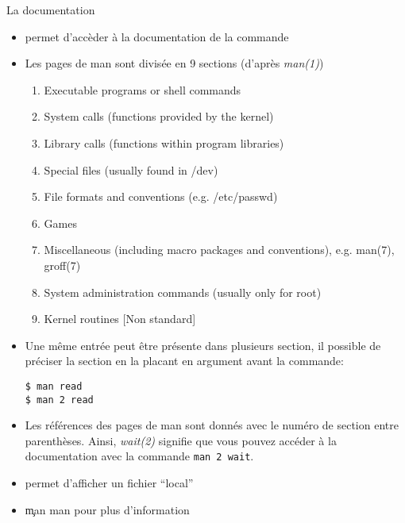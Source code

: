 \begin{frame}[fragile=singleslide]{La documentation}
  \begin{itemize}
  \item   {} permet d'accèder à la documentation de la commande
  \item Les pages de man sont divisée en 9 sections (d'après \emph{man(1)})
    \begin{enumerate}
    \item Executable programs or shell commands
    \item System calls (functions provided by the kernel)
    \item Library calls (functions within program libraries)
    \item Special files (usually found in /dev)
    \item File formats and conventions (e.g. /etc/passwd)
    \item Games
    \item Miscellaneous (including macro packages and conventions),
      e.g.  man(7), groff(7)
    \item System administration commands (usually only for root)
    \item Kernel routines [Non standard]
    \end{enumerate}
  \item Une même entrée peut être présente dans plusieurs section, il
    possible de préciser la section en la placant en argument avant la
    commande:
    \begin{lstlisting}
$ man read
$ man 2 read
    \end{lstlisting}
  \item Les références des pages de man sont donnés avec le numéro de
    section entre parenthèses.  Ainsi, \textit{wait(2)} signifie que
    vous pouvez accéder à la documentation avec la commande
    \verb+man 2 wait+.
  \item {}  permet d'afficher un fichier ``local''
  \item \c{man man} pour plus d'information
  \end{itemize}
\end{frame}


